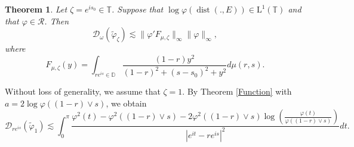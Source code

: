 \documentclass[12pt,reqno,a4paper]{amsart}
\newtheorem{theo}[prop]{Theorem}
\newcommand\TT{\mathbb{T}}
\newcommand\DD{\mathbb{D}}
\newcommand{\cD}{{\mathcal{D}}}
\DeclareMathOperator{\dist}{dist}
\numberwithin{equation}{section}
\begin{document}
\begin{theo}\label{NE} 
	Let $\zeta= e^{is_0}\in \TT$. Suppose that $ \log \varphi( \dist(.,E)) \in \mathrm{L}^1(\TT)$  and  that $\varphi \in \mathcal{R}$. Then
	$$
	\cD_\omega(\tilde {\varphi}_{\zeta}) \lesssim \|\varphi' F_{\mu,\zeta} \|_\infty \| \varphi \|_\infty,
	$$
	where 
	$$F_{\mu,\zeta}(y)=\displaystyle \int _{re^{is}\in \DD} \frac{(1-r)y^2}{(1-r)^2+(s-s_0)^2+y^2}d\mu(r,s).$$
\end{theo}
Without loss of generality, we assume that $\zeta=1$. By Theorem \ref{Function}  with $a= 2\log\varphi((1-r)\vee s)$, we obtain 
$$\cD _{re^{is}}(\tilde{\varphi}_1)\lesssim \displaystyle \int_0 ^{\pi} \frac{\varphi ^2(t)-\varphi^2((1-r)\vee s)-2\varphi^2((1-r)\vee s)\log\left ( \frac{\varphi (t)}{\varphi((1-r)\vee s)}\right )}{|e^{it}-re^{is}|^2}dt.$$
\end{document}
